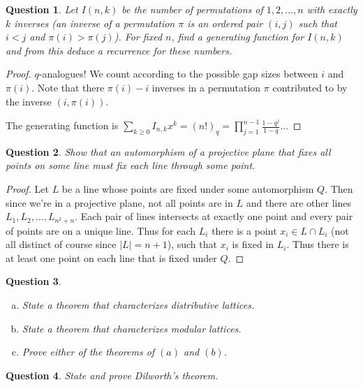 \documentclass[12]{article}
\newtheorem{question}{Question}
\theoremstyle{definition}
\begin{document}
	\begin{question}
		Let $I(n,k)$ be the number of permutations of $1, 2, \ldots, n$ with exactly $k$ inverses (an inverse of a permutation $\pi$ is an ordered pair $(i,j)$ such that $i < j$ and $\pi(i) > \pi(j)$).  For fixed $n$, find a generating function for $I(n,k)$ and from this deduce a recurrence for these numbers.
	\end{question}

	\begin{proof}
		$q$-analogues!  We count according to the possible gap sizes between $i$ and $\pi(i)$.  Note that there $\pi(i) - i$ inverses in a permutation $\pi$ contributed to by the inverse $(i,\pi(i))$.
		
		The generating function is $\sum_{k \geq 0} I_{n,k}x^k = (n!)_q = \prod_{j = 1}^{n-1} \frac{1-q^j}{1-q}$...
	\end{proof}

	\begin{question}
		Show that an automorphism of a projective plane that fixes all points on some line must fix each line through some point.
	\end{question}
	\begin{proof}
		Let $L$ be a line whose points are fixed under some automorphism $Q$.  Then since we're in a projective plane, not all points are in $L$ and there are other lines $L_1, L_2, \ldots, L_{n^2 + n}$.  Each pair of lines intersects at exactly one point and every pair of points are on a unique line.  Thus for each $L_i$ there is a point $x_i \in L \cap L_i$ (not all distinct of course since $|L| = n+1$), such that $x_i$ is fixed in $L_i$.  Thus there is at least one point on each line that is fixed under $Q$.
	\end{proof}

	\begin{question}
		\
		\begin{enumerate}[a)]
			\item State a theorem that characterizes distributive lattices.
			\item State a theorem that characterizes modular lattices.
			\item Prove either of the theorems of $(a)$ and $(b)$.
		\end{enumerate}
	\end{question}
	
	\begin{question}
		State and prove Dilworth's theorem.
	\end{question}
	
\end{document}
